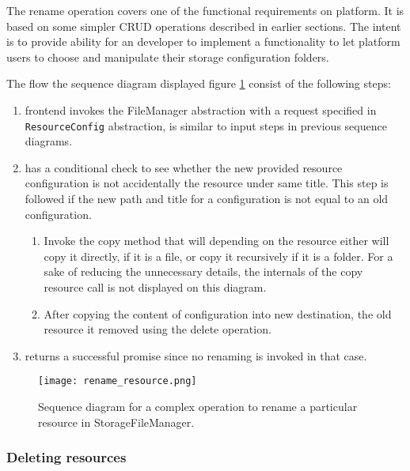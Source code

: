 The rename operation covers one of the functional requirements on \lpa{} platform. It is based on some  simpler CRUD operations described in earlier sections. The intent  is to provide  ability for an \lpa{} developer to implement a functionality to let \lpa{} platform users to choose and manipulate their storage configuration folders. 

The flow  the sequence diagram displayed  figure \ref{fig:lps_rename_resource} consist of the following steps:

\begin{enumerate}
    \item \lpa{} frontend invokes the FileManager abstraction with a request specified in  \texttt{ResourceConfig} abstraction,  is similar to  input steps in  previous sequence diagrams. 
    \item \lpas{} has a conditional check to see whether the new provided resource configuration is not accidentally the resource under same title. This step is followed if the new path and title for a configuration is not equal to an old configuration.
    	\begin{enumerate}
    	\item Invoke the copy method that will depending on the resource either will copy it directly, if it is a file, or copy it recursively if it is a folder. For a sake of reducing the unnecessary details, the internals of the copy resource call is not displayed on this diagram.
    	\item After copying the content of configuration into new destination, the old resource it removed using the delete operation.
    	\end{enumerate}
    \item \lpas{} returns a successful promise since no renaming is invoked in that case. 
\end{enumerate}

\begin{figure}[h]
\centering
\texttt{[image: rename\_resource.png]}
\caption{Sequence diagram for a complex operation to rename a particular resource in StorageFileManager.}
\label{fig:lps_rename_resource}
\end{figure}

\subsubsection{Deleting resources}

